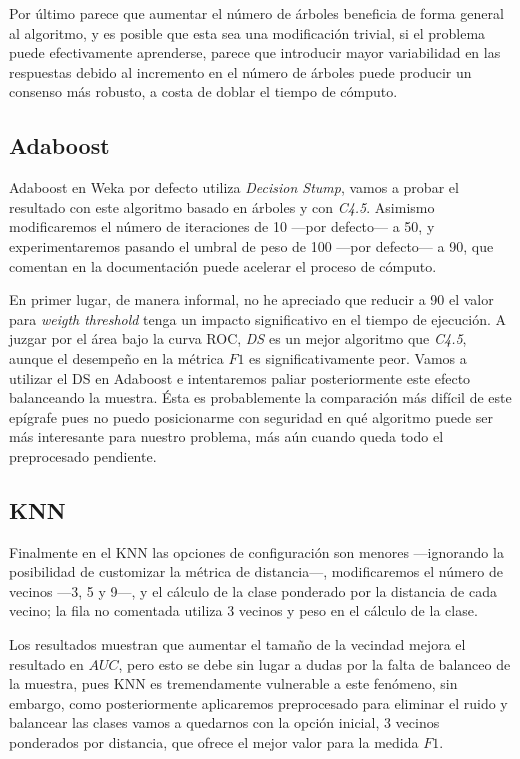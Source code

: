 \documentclass{article}
\newcommand{\img}[2]{
\noindent\makebox[\textwidth][c]{\texttt{[image: \#1]}}%
}
\begin{document}
Por último parece que aumentar el número de árboles beneficia de forma general al algoritmo,  y es posible que esta sea una modificación trivial, si el problema puede efectivamente aprenderse, parece que introducir mayor variabilidad en las respuestas debido al incremento en el número de árboles puede producir un consenso más robusto, a costa de doblar el tiempo de cómputo.

\subsection{Adaboost}

Adaboost en Weka por defecto utiliza \textit{Decision Stump}, vamos a probar el resultado con este algoritmo basado en árboles y con \textit{C4.5}. Asimismo modificaremos el número de iteraciones de 10 ---por defecto--- a 50, y experimentaremos pasando el umbral de peso de 100 ---por defecto--- a 90, que comentan en la documentación puede acelerar el proceso de cómputo.

\img{abtuning}{1.2}

En primer lugar, de manera informal, no he apreciado que reducir a 90 el valor para \textit{weigth threshold} tenga un impacto significativo en el tiempo de ejecución. A juzgar por el área bajo la curva ROC, \textit{DS} es un mejor algoritmo que \textit{C4.5}, aunque el desempeño en la métrica $F1$ es significativamente peor. Vamos a utilizar el DS en Adaboost e intentaremos paliar posteriormente este efecto balanceando la muestra. Ésta es probablemente la comparación más difícil de este epígrafe pues no puedo posicionarme con seguridad en qué algoritmo puede ser más interesante para nuestro problema, más aún cuando queda todo el preprocesado pendiente.


\subsection{KNN}

Finalmente en el KNN las opciones de configuración son menores ---ignorando la posibilidad de customizar la métrica de distancia---, modificaremos el número de vecinos ---3, 5 y 9---, y el cálculo de la clase ponderado por la distancia de cada vecino; la fila no comentada utiliza 3 vecinos y peso en el cálculo de la clase.

\img{knntuning}{1.2}

Los resultados muestran que aumentar el tamaño de la vecindad mejora el resultado en $AUC$, pero esto se debe sin lugar a dudas por la falta de balanceo de la muestra, pues KNN es tremendamente vulnerable a este fenómeno, sin embargo, como posteriormente aplicaremos preprocesado para eliminar el ruido y balancear las clases vamos a quedarnos con la opción inicial, 3 vecinos ponderados por distancia, que ofrece el mejor valor para la medida $F1$.
\end{document}
